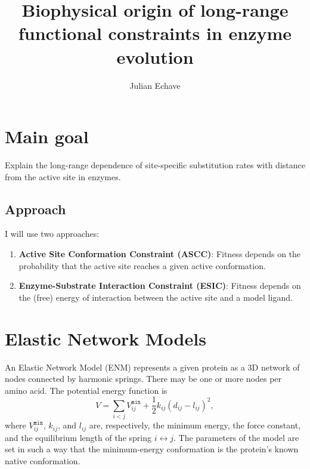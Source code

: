 \documentclass[12pt]{article}
\newcommand{\lij}{l_{ij}}
\newcommand{\kij}{k_{ij}}
\newcommand{\vijMin}{V^{\mathtt{min}}_{ij}}
\begin{document}
\title{Biophysical origin of long-range functional constraints in enzyme evolution}
\author{Julian Echave}
\date{}


\maketitle


\section{Main goal}

Explain the long-range dependence of site-specific substitution rates with distance from the active site in enzymes.

\subsection{Approach}
I will use two approaches:

\begin{enumerate}

\item \textbf{Active Site Conformation Constraint (ASCC)}: Fitness depends on the probability that the active site reaches a given active conformation.

\item \textbf{Enzyme-Substrate Interaction Constraint (ESIC)}: Fitness depends on the (free) energy of interaction between the active site and a model ligand.

\end{enumerate}


\section{Elastic Network Models}

An Elastic Network Model (ENM)  represents a given protein as a 3D network of nodes connected by harmonic springs. There may be one or more nodes per amino acid. The potential energy function is 
\begin{equation} \label{eq:vENM}
\boxed{
V =   \sum_{i<j} \vijMin +\frac{1}{2}\kij (d_{ij}-\lij)^2,
}
\end{equation}
where $\vijMin$, $\kij$, and $\lij$ are, respectively, the minimum energy, the force constant, and the equilibrium length of the spring $i \leftrightarrow j$. The parameters of the model are set in such a way that the minimum-energy conformation is the protein's known native conformation.
\end{document}
